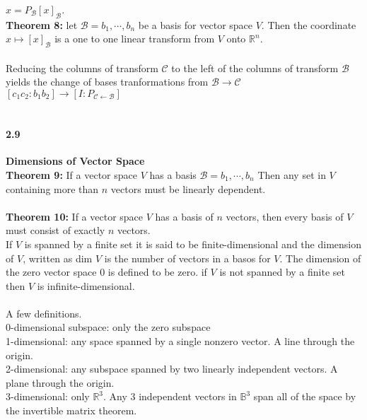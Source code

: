 \documentclass[14pt]{extreport}
\begin{document}
$x = P_\mathcal{B} [x]_{\mathcal{B}}$.\\

\textbf{Theorem 8: }let $\mathcal{B} = {b_1, \cdots , b_n}$ be a basis for vector space $V$. Then the coordinate $x \mapsto [x]_{\mathcal{B}}$ is a one to one linear transform from $V$ onto $\mathbb{R}^n$.\\\\

Reducing the columns of transform $\mathcal{C}$ to the left of the columns of transform $\mathcal{B}$ yields the change of bases tranformations from
$\mathcal{B} \to \mathcal{C}$\\
$[c_1 c_2 : b_1 b_2] \to [ I : P_{\mathcal{C} \leftarrow \mathcal{B}}]$\\\\

\paragraph{2.9} \textbf{Dimensions of Vector Space}\\

\textbf{Theorem 9: } If a vector space $V$ has a basis $\mathcal{B} = {b_1, \cdots, b_n}$ Then any set in $V$ containing more than $n$ vectors must be linearly dependent.\\\\

\textbf{Theorem 10: } If a vector space $V$ has a basis of $n$ vectors, then every basis of $V$ must consist of exactly $n$ vectors.\\

If $V$ is spanned by a finite set it is said to be finite-dimensional and the dimension of $V$, written as dim $V$ is the number of vectors in a basos for $V$. The dimension of the zero vector space {0} is defined to be zero. if $V$ is not spanned by a finite set then $V$ is infinite-dimensional.\\\\

A few definitions.\\
0-dimensional subspace: only the zero subspace\\
1-dimensional: any space spanned by a single nonzero vector. A line through the origin.\\
2-dimensional: any subspace spanned by two linearly independent vectors. A plane through the origin.\\
3-dimensional: only $\mathbb{R}^3$. Any 3 independent vectors in $\mathbb{B}^3$ span all of the space by the invertible matrix theorem.\\
\end{document}
